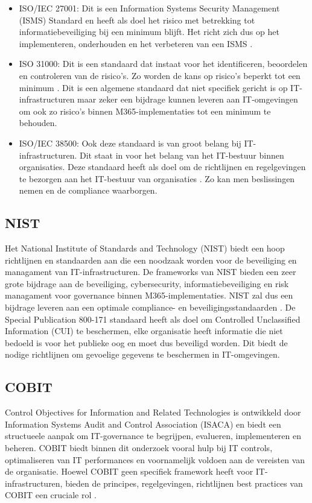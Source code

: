 \begin{itemize}
  \item ISO/IEC 27001:
  Dit is een Information Systems Security Management (ISMS) Standard en heeft als doel het risico met betrekking tot informatiebeveiliging bij een minimum blijft. Het richt zich dus op het implementeren, onderhouden en het verbeteren van een ISMS \autocite{VladisLavV.2008}.
  \item ISO 31000:
  Dit is een standaard dat instaat voor het identificeren, beoordelen en controleren van de risico's. Zo worden de kans op risico's beperkt tot een minimum \autocite{Carole2012}.
  Dit is een algemene standaard dat niet specifiek gericht is op IT-infrastructuren maar zeker een bijdrage kunnen leveren aan IT-omgevingen om ook zo risico's binnen M365-implementaties tot een minimum te behouden.
  \item ISO/IEC 38500:
  Ook deze standaard is van groot belang bij IT-infrastructuren. Dit staat in voor het belang van het IT-bestuur binnen organisaties. Deze standaard heeft als doel om de richtlijnen en regelgevingen te bezorgen aan het IT-bestuur van organisaties \autocite{Alan2023}. Zo kan men beslissingen nemen en de compliance waarborgen.

\end{itemize}

\subsection{NIST}
Het National Institute of Standards and Technology (NIST) biedt een hoop richtlijnen en standaarden aan die een noodzaak worden voor de beveiliging en managament van IT-infrastructuren. De frameworks van NIST bieden een zeer grote bijdrage aan de beveiliging, cybersecurity, informatiebeveiliging en risk managament voor governance binnen M365-implementaties.
NIST zal dus een bijdrage leveren aan een optimale compliance- en beveiligingsstandaarden \autocite{Sultan2017}.
De Special Publication 800-171 standaard heeft als doel om Controlled Unclassified Information (CUI) te beschermen, elke organisatie heeft informatie die niet bedoeld is voor het publieke oog en moet dus beveiligd worden. Dit biedt de nodige richtlijnen om gevoelige gegevens te beschermen in IT-omgevingen.

\subsection{COBIT}
Control Objectives for Information and Related Technologies is ontwikkeld door Information Systems Audit and Control Association (ISACA) en biedt een structueele aanpak om IT-governance te begrijpen, evalueren, implementeren en beheren. COBIT biedt binnen dit onderzoek vooral hulp bij IT controls, optimaliseren van IT performances en voornamelijk voldoen aan de vereisten van de organisatie.
Hoewel COBIT geen specifiek framework heeft voor IT-infrastructuren, bieden de principes, regelgevingen, richtlijnen best practices van COBIT een cruciale rol \autocite{George2014}. 

